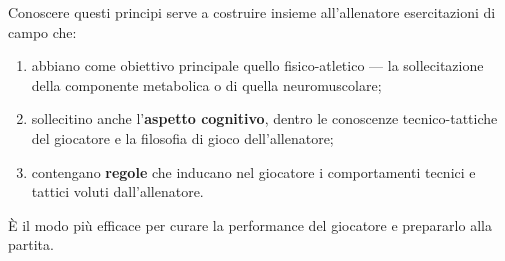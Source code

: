 Conoscere questi principi serve a costruire insieme all'allenatore esercitazioni di campo che:
\begin{enumerate}
  \item abbiano come obiettivo principale quello fisico-atletico --- la sollecitazione della
    componente metabolica o di quella neuromuscolare;
  \item sollecitino anche l'\textbf{aspetto cognitivo}, dentro le conoscenze tecnico-tattiche del
    giocatore e la filosofia di gioco dell'allenatore;
  \item contengano \textbf{regole} che inducano nel giocatore i comportamenti tecnici e tattici
    voluti dall'allenatore.
\end{enumerate}
È il modo più efficace per curare la performance del giocatore e prepararlo alla partita.
